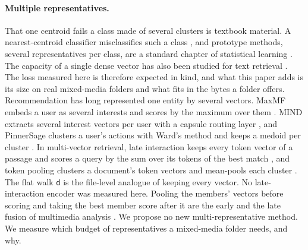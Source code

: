 \documentclass[11pt]{article}
\newcommand{\rep}[1]{\texttt{#1}}
\begin{document}
\paragraph{Multiple representatives.} That one centroid fails a class made of several clusters is textbook material. A nearest-centroid classifier misclassifies such a class \citep{manning2008iir}, and prototype methods, several representatives per class, are a standard chapter of statistical learning \citep{hastie2009esl}. The capacity of a single dense vector has also been studied for text retrieval \citep{luan2021sparse}. The loss measured here is therefore expected in kind, and what this paper adds is its size on real mixed-media folders and what fits in the bytes a folder offers. Recommendation has long represented one entity by several vectors. MaxMF embeds a user as several interests and scores by the maximum over them \citep{weston2013maxmf}. MIND extracts several interest vectors per user with a capsule routing layer \citep{li2019mind}, and PinnerSage clusters a user's actions with Ward's method and keeps a medoid per cluster \citep{pal2020pinnersage}. In multi-vector retrieval, late interaction keeps every token vector of a passage and scores a query by the sum over its tokens of the best match \citep{khattab2020colbert}, and token pooling clusters a document's token vectors and mean-pools each cluster \citep{clavie2024tokenpooling}. The flat walk \rep{d} is the file-level analogue of keeping every vector. No late-interaction encoder was measured here. Pooling the members' vectors before scoring and taking the best member score after it are the early and the late fusion of multimedia analysis \citep{snoek2005fusion}. We propose no new multi-representative method. We measure which budget of representatives a mixed-media folder needs, and why.
\end{document}
